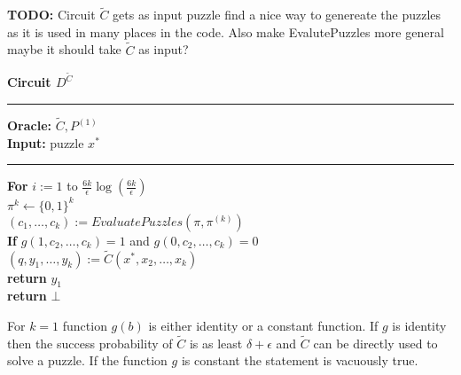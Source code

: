 %
%
%
\begin{todo}
  \textbf{TODO:} Circuit $\widetilde{C}$ gets as input puzzle find a nice way to genereate the puzzles as it is used in many places in the code.
   Also make EvalutePuzzles more general maybe it should take $\widetilde{C}$ as input?
\end{todo}
\begin{codeblock}
  \textbf{Circuit $D^{\widetilde{C}}$}
  \medskip

  \hrule

  \medskip

  \textbf{Oracle:}  $\widetilde{C}, P^{(1)}$\\
  \textbf{Input:}  puzzle $x^*$

  \medskip\hrule\medskip
  \textbf{For} $i:=1$ to $\frac{6k}{\epsilon} \log(\frac{6k}{\epsilon})$\\
  \IndI $\pi^{k} \leftarrow \{0,1\}^{k}$\\
  \IndI $(c_1, \dots, c_k) := EvaluatePuzzles(\pi, \pi^{(k)})$\\
  \IndI \textbf{If} $g(1,c_2, \dots, c_k) = 1$ and $g(0,c_2, \dots, c_k) = 0$\\
  \IndII $(q, y_1, \dots, y_k) := \widetilde{C}(x^*, x_2, \dots, x_k)$\\
  \IndII \textbf{return} $y_1$\\
  \textbf{return} $\bot$ \\

\end{codeblock}
%
%
For $k=1$ function $g(b)$ is either identity or a constant function.
If $g$ is identity then the success probability of $\widetilde{C}$ is as least $\delta + \epsilon$
and $\widetilde{C}$ can be directly used to solve a puzzle. If the function $g$ is constant the statement is vacuously true.

